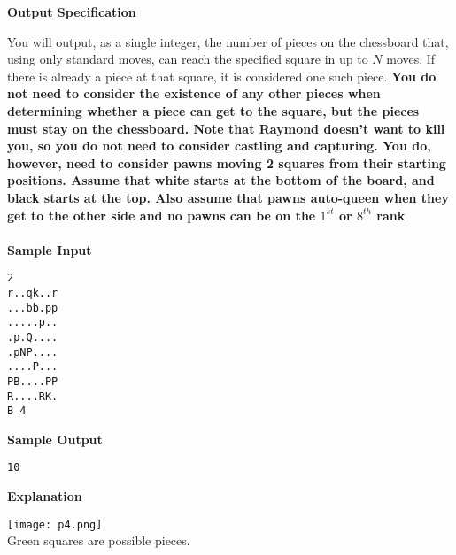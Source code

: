 \documentclass[]{article}
\begin{document}
\textbf{\large Output Specification}
\par
You will output, as a single integer, the number of pieces on the chessboard that, using only standard moves, can reach the specified square in up to $N$ moves. If there is already a piece at that square, it is considered one such piece. \textbf{You do not need to consider the existence of any other pieces when determining whether a piece can get to the square, but the pieces must stay on the chessboard. Note that Raymond doesn't want to kill you, so you do not need to consider castling and capturing. You do, however, need to consider pawns moving 2 squares from their starting positions. Assume that white starts at the bottom of the board, and black starts at the top. Also assume that pawns auto-queen when they get to the other side and no pawns can be on the $1^{st}$ or $8^{th}$ rank}
\\\\
\textbf{\large Sample Input}
\begin{verbatim}
2
r..qk..r
...bb.pp
.....p..
.p.Q....
.pNP....
....P...
PB....PP
R....RK.
B 4
\end{verbatim}
\textbf{\large Sample Output}
\begin{verbatim}
10
\end{verbatim}

\textbf{\large Explanation}

\texttt{[image: p4.png]}
\\
Green squares are possible pieces.
\thispagestyle{empty}
\end{document}

